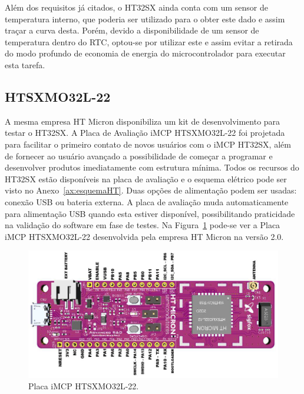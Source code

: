 Além dos requisitos já citados, o HT32SX ainda conta com um sensor de temperatura interno, que poderia ser utilizado para o obter este dado e assim traçar a curva desta. Porém, devido a disponibilidade de um sensor de temperatura dentro do RTC, optou-se por utilizar este e assim evitar a retirada do modo profundo de economia de energia do microcontrolador para executar esta tarefa.
\subsection{HTSXMO32L-22}
A mesma empresa HT Micron disponibiliza um kit de desenvolvimento para testar o HT32SX. A Placa de Avaliação iMCP HTSXMO32L-22 foi projetada para facilitar o primeiro contato de novos usuários com o iMCP HT32SX, além de fornecer ao usuário avançado a possibilidade de começar a programar e desenvolver produtos imediatamente com estrutura mínima. Todos os recursos do HT32SX estão disponíveis na placa de avaliação e o esquema elétrico pode ser visto no Anexo~\ref{ax:esquemaHT}. Duas opções de alimentação podem ser usadas: conexão USB ou bateria externa. A placa de avaliação muda automaticamente para alimentação USB quando esta estiver disponível, possibilitando praticidade na validação do software em fase de testes. Na Figura~\ref{fig:placaHT32SX} pode-se ver a Placa iMCP HTSXMO32L-22 desenvolvida pela empresa HT Micron na versão 2.0.

\begin{figure}[h!]
  \caption{Placa iMCP HTSXMO32L-22.}
  \begin{center}
      \includegraphics[scale=0.5]{img/placa.png}
  \end{center}
  \label{fig:placaHT32SX}
\end{figure}

